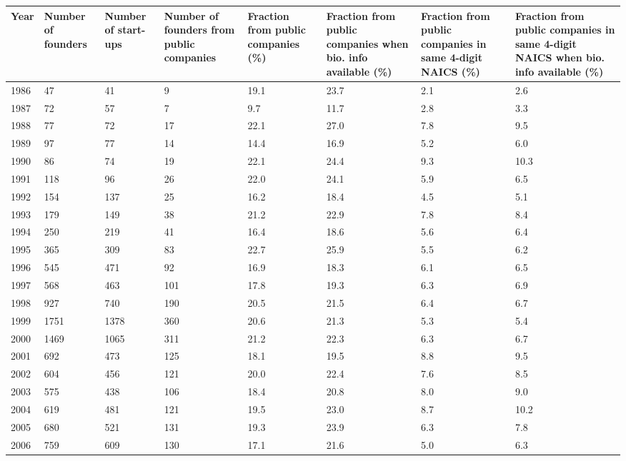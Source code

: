 \begin{table}[!htb]
\centering
\begingroup\scriptsize
\begin{tabular}{p{1.75cm}p{1.75cm}p{1.75cm}p{1.75cm}p{1.75cm}p{1.75cm}p{1.75cm}p{1.75cm}}
  \toprule
Year & Number of founders & Number of start-ups & Number of founders from public companies & Fraction from public companies (\%) & Fraction from public companies when bio. info available (\%) & Fraction from public companies in same 4-digit NAICS (\%) & Fraction from public companies in same 4-digit NAICS when bio. info available (\%) \\ 
  \midrule
1986 & 47 & 41 &  9 & 19.1 & 23.7 & 2.1 & 2.6 \\ 
  1987 & 72 & 57 &  7 & 9.7 & 11.7 & 2.8 & 3.3 \\ 
  1988 & 77 & 72 & 17 & 22.1 & 27.0 & 7.8 & 9.5 \\ 
  1989 & 97 & 77 & 14 & 14.4 & 16.9 & 5.2 & 6.0 \\ 
  1990 & 86 & 74 & 19 & 22.1 & 24.4 & 9.3 & 10.3 \\ 
  1991 & 118 & 96 & 26 & 22.0 & 24.1 & 5.9 & 6.5 \\ 
  1992 & 154 & 137 & 25 & 16.2 & 18.4 & 4.5 & 5.1 \\ 
  1993 & 179 & 149 & 38 & 21.2 & 22.9 & 7.8 & 8.4 \\ 
  1994 & 250 & 219 & 41 & 16.4 & 18.6 & 5.6 & 6.4 \\ 
  1995 & 365 & 309 & 83 & 22.7 & 25.9 & 5.5 & 6.2 \\ 
  1996 & 545 & 471 & 92 & 16.9 & 18.3 & 6.1 & 6.5 \\ 
  1997 & 568 & 463 & 101 & 17.8 & 19.3 & 6.3 & 6.9 \\ 
  1998 & 927 & 740 & 190 & 20.5 & 21.5 & 6.4 & 6.7 \\ 
  1999 & 1751 & 1378 & 360 & 20.6 & 21.3 & 5.3 & 5.4 \\ 
  2000 & 1469 & 1065 & 311 & 21.2 & 22.3 & 6.3 & 6.7 \\ 
  2001 & 692 & 473 & 125 & 18.1 & 19.5 & 8.8 & 9.5 \\ 
  2002 & 604 & 456 & 121 & 20.0 & 22.4 & 7.6 & 8.5 \\ 
  2003 & 575 & 438 & 106 & 18.4 & 20.8 & 8.0 & 9.0 \\ 
  2004 & 619 & 481 & 121 & 19.5 & 23.0 & 8.7 & 10.2 \\ 
  2005 & 680 & 521 & 131 & 19.3 & 23.9 & 6.3 & 7.8 \\ 
  2006 & 759 & 609 & 130 & 17.1 & 21.6 & 5.0 & 6.3 \\ 

\end{tabular}
\end{table}
